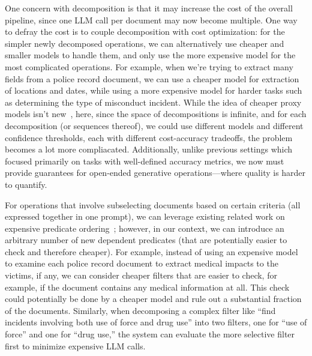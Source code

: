 One concern with decomposition is that
it may increase the cost of the overall pipeline,
since one LLM call per document may now become
multiple. 
One way to defray the cost is to couple decomposition
with cost optimization:
for the simpler newly decomposed operations,
we can alternatively use cheaper and smaller
models to handle them, and only use the more expensive model 
for the most complicated operations.
For example, when we're trying to extract many fields
from a police record document, we can use a cheaper
model for extraction of locations and dates, while using
a more expensive model for harder tasks such as
determining the type of misconduct incident.
While the idea of cheaper proxy models isn't new~\cite{},
here, since the space of decompositions is infinite,
and for each decomposition (or sequences thereof), 
we could use different
models and different confidence thresholds, each with 
different cost-accuracy tradeoffs, the problem
becomes a lot more compliacated.
Additionally, unlike previous settings which focused primarily on tasks with well-defined accuracy metrics, we now must provide guarantees for open-ended generative operations---where quality is harder to quantify.

 
For operations that involve subselecting documents
based on certain criteria (all expressed
together in one prompt), we can leverage existing
related work on expensive predicate ordering~\cite{};
however, in our context, we can introduce an arbitrary
number of new dependent predicates (that are potentially easier
to check and therefore cheaper).
For example, instead of using an expensive model
to examine each police record document to extract
medical impacts to the victims, if any,
we can consider cheaper filters
that are easier to check, for example, 
if the document contains any medical information at all.
This check could potentially be done by a cheaper
model and rule out a substantial fraction of the documents.
Similarly, when decomposing a complex filter like ``find 
incidents involving both use of force and drug use'' into two 
filters, one for ``use of force'' and one for ``drug use,'' the 
system can evaluate the more selective filter first to minimize expensive LLM calls.








